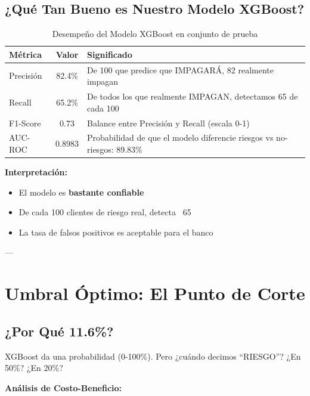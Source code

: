 \documentclass[11pt,a4paper,spanish]{article}
\begin{document}
\subsection{¿Qué Tan Bueno es Nuestro Modelo XGBoost?}

\begin{table}[H]
\centering
\begin{tabular}{|l|c|l|}
\hline
\textbf{Métrica} & \textbf{Valor} & \textbf{Significado} \\
\hline
Precisión & 82.4\% & De 100 que predice que IMPAGARÁ, 82 realmente impagan \\
\hline
Recall & 65.2\% & De todos los que realmente IMPAGAN, detectamos 65 de cada 100 \\
\hline
F1-Score & 0.73 & Balance entre Precisión y Recall (escala 0-1) \\
\hline
AUC-ROC & 0.8983 & Probabilidad de que el modelo diferencie riesgos vs no-riesgos: 89.83\% \\
\hline
\end{tabular}
\caption{Desempeño del Modelo XGBoost en conjunto de prueba}
\end{table}

\textbf{Interpretación:}
\begin{itemize}
    \item El modelo es \textbf{bastante confiable}
    \item De cada 100 clientes de riesgo real, detecta ~65
    \item La tasa de falsos positivos es aceptable para el banco
\end{itemize}

---

\section{Umbral Óptimo: El Punto de Corte}

\subsection{¿Por Qué 11.6\%?}

XGBoost da una probabilidad (0-100\%). Pero ¿cuándo decimos ``RIESGO''? ¿En 50\%? ¿En 20\%?

\textbf{Análisis de Costo-Beneficio:}
\end{document}
